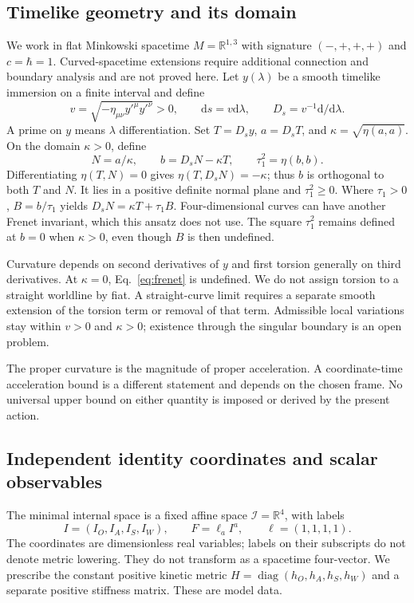 \documentclass[11pt]{article}
\newcommand{\dd}{\mathrm d}
\newcommand{\Ds}{D_s}
\newcommand{\I}{\mathcal I}
\begin{document}
\subsection{Timelike geometry and its domain}
We work in flat Minkowski spacetime $M=\mathbb R^{1,3}$ with signature $(-,+,+,+)$ and $c=\hbar=1$. Curved-spacetime extensions require additional connection and boundary analysis and are not proved here. Let $y(\lambda)$ be a smooth timelike immersion on a finite interval and define
\begin{equation}
 v=\sqrt{-\eta_{\mu\nu}y'^{\mu}y'^{\nu}}>0,
 \qquad \dd s=v\dd\lambda,\qquad
 \Ds=v^{-1}\dd/\dd\lambda .
 \label{eq:proper}
\end{equation}
A prime on $y$ means $\lambda$ differentiation. Set $T=\Ds y$, $a=\Ds T$, and $\kappa=\sqrt{\eta(a,a)}$. On the domain $\kappa>0$, define
\begin{equation}
 N=a/\kappa,\qquad b=\Ds N-\kappa T,
 \qquad \tau_1^2=\eta(b,b).
 \label{eq:frenet}
\end{equation}
Differentiating $\eta(T,N)=0$ gives $\eta(T,\Ds N)=-\kappa$; thus $b$ is orthogonal to both $T$ and $N$. It lies in a positive definite normal plane and $\tau_1^2\geq0$. Where $\tau_1>0$, $B=b/\tau_1$ yields $\Ds N=\kappa T+\tau_1B$. Four-dimensional curves can have another Frenet invariant, which this ansatz does not use. The square $\tau_1^2$ remains defined at $b=0$ when $\kappa>0$, even though $B$ is then undefined.

Curvature depends on second derivatives of $y$ and first torsion generally on third derivatives. At $\kappa=0$, Eq.~\eqref{eq:frenet} is undefined. We do not assign torsion to a straight worldline by fiat. A straight-curve limit requires a separate smooth extension of the torsion term or removal of that term. Admissible local variations stay within $v>0$ and $\kappa>0$; existence through the singular boundary is an open problem.

The proper curvature is the magnitude of proper acceleration. A coordinate-time acceleration bound is a different statement and depends on the chosen frame. No universal upper bound on either quantity is imposed or derived by the present action.

\subsection{Independent identity coordinates and scalar observables}
The minimal internal space is a fixed affine space $\I=\mathbb R^4$, with labels
\begin{equation}
I=(I_O,I_A,I_S,I_W),\qquad F=\ell_a I^a,\qquad\ell=(1,1,1,1).\label{eq:identity}
\end{equation}
The coordinates are dimensionless real variables; labels on their subscripts do not denote metric lowering. They do not transform as a spacetime four-vector. We prescribe the constant positive kinetic metric $H=\operatorname{diag}(h_O,h_A,h_S,h_W)$ and a separate positive stiffness matrix. These are model data.
\end{document}
